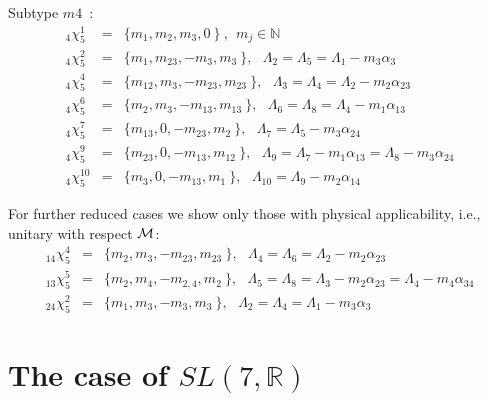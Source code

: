 \documentclass[a4paper]{jpconf}
\def\bb {\begin {eqnarray}}
\def\eqnn#1{\bb\label{#1}}
\def\eea {\end {eqnarray}}
\def\nn{\nonumber}
\def\bbr{\mathbb{R}}%
\def\bbn{\mathbb{N}}%
\def\a{\alpha}
\def\cm{{\cal M}} \def\cn{{\cal N}} \def\co{{\cal O}}
\def\L{\Lambda}
\begin{document}
Subtype $m4$~:
\eqnn{slt5}
_4\chi^1_5 &=& \{ m_1, m_2, m_3, 0 \   \} \ , ~~m_j \in\bbn \\
_4\chi^2_5 &=& \{ m_1, m_{23}, -m_3, m_{3} \   \} , ~~~\L_2 = \L_5 =\L_1 - m_3 \a_3 \nn\\
_4\chi^4_5 &=& \{ m_{12}, m_{3}, -m_{23}, m_{23} \   \} , ~~~\L_3 = \L_4 = \L_2 - m_2 \a_{23} \nn\\
_4\chi^6_5 &=& \{ m_{2}, m_{3}, -m_{13}, m_{13} \   \} , ~~~\L_6 = \L_8 = \L_4 - m_1 \a_{13} \nn\\
_4\chi^7_5 &=& \{ m_{13}, 0, -m_{23}, m_{2} \   \} , ~~~\L_7 = \L_5 - m_3 \a_{24} \nn\\
_4\chi^9_5 &=& \{ m_{23}, 0, -m_{13}, m_{12} \   \} , ~~~\L_9 = \L_7 - m_1 \a_{13} = \L_8 - m_3 \a_{24} \nn\\
_4\chi^{10}_5 &=& \{ m_{3},0, -m_{13}, m_{1} \   \} , ~~~\L_{10} = \L_9 - m_2 \a_{14} \nn\eea


For further reduced cases we show only those with physical applicability, i.e.,  unitary with respect $\cm$:
 \eqnn{slt513}
  _{14}\chi^4_5 &=& \{ m_{2}, m_{3}, -m_{23}, m_{23} \   \} , ~~~\L_4 = \L_6 = \L_2 - m_2 \a_{23} \nn\\
_{13}\chi^5_5 &=& \{ m_{2}, m_{4}, -m_{2,4}, m_{2} \   \} , ~~~\L_5 = \L_8 = \L_3 - m_2 \a_{23} = \L_4 - m_4 \a_{34} \nn\\
_{24}\chi^2_5 &=& \{ m_1, m_{3}, -m_3, m_{3} \   \} , ~~~\L_2 = \L_4 = \L_1 - m_3 \a_3 \nn
  \eea















\section{The case of $SL(7,\bbr)$}
\end{document}
